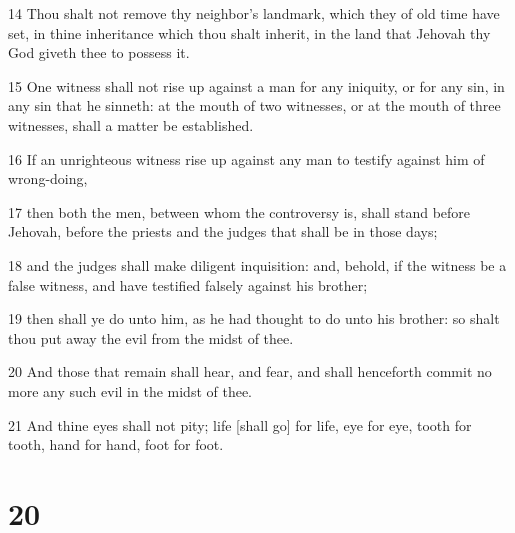\par 14 Thou shalt not remove thy neighbor's landmark, which they of old time have set, in thine inheritance which thou shalt inherit, in the land that Jehovah thy God giveth thee to possess it.
\par 15 One witness shall not rise up against a man for any iniquity, or for any sin, in any sin that he sinneth: at the mouth of two witnesses, or at the mouth of three witnesses, shall a matter be established.
\par 16 If an unrighteous witness rise up against any man to testify against him of wrong-doing,
\par 17 then both the men, between whom the controversy is, shall stand before Jehovah, before the priests and the judges that shall be in those days;
\par 18 and the judges shall make diligent inquisition: and, behold, if the witness be a false witness, and have testified falsely against his brother;
\par 19 then shall ye do unto him, as he had thought to do unto his brother: so shalt thou put away the evil from the midst of thee.
\par 20 And those that remain shall hear, and fear, and shall henceforth commit no more any such evil in the midst of thee.
\par 21 And thine eyes shall not pity; life [shall go] for life, eye for eye, tooth for tooth, hand for hand, foot for foot.

\chapter{20}

